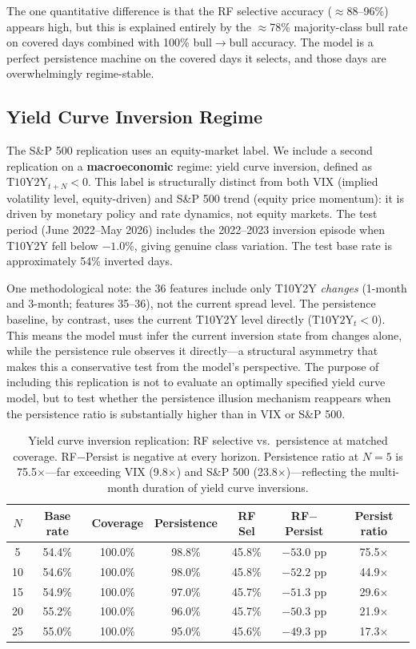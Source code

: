 \documentclass[11pt]{article}
\begin{document}
The one quantitative difference is that the RF selective accuracy ($\approx$88--96\%) appears high, but this is explained entirely by the $\approx$78\% majority-class bull rate on covered days combined with 100\% bull$\to$bull accuracy. The model is a perfect persistence machine on the covered days it selects, and those days are overwhelmingly regime-stable.

\subsection{Yield Curve Inversion Regime}
\label{sec:yc_replication}

The S\&P 500 replication uses an equity-market label. We include a second replication on a \textbf{macroeconomic} regime: yield curve inversion, defined as $\text{T10Y2Y}_{t+N} < 0$. This label is structurally distinct from both VIX (implied volatility level, equity-driven) and S\&P 500 trend (equity price momentum): it is driven by monetary policy and rate dynamics, not equity markets. The test period (June 2022--May 2026) includes the 2022--2023 inversion episode when T10Y2Y fell below $-1.0$\%, giving genuine class variation. The test base rate is approximately 54\% inverted days.

One methodological note: the 36 features include only T10Y2Y \emph{changes} (1-month and 3-month; features 35--36), not the current spread level. The persistence baseline, by contrast, uses the current T10Y2Y level directly ($\text{T10Y2Y}_t < 0$). This means the model must infer the current inversion state from changes alone, while the persistence rule observes it directly---a structural asymmetry that makes this a conservative test from the model's perspective. The purpose of including this replication is not to evaluate an optimally specified yield curve model, but to test whether the persistence illusion mechanism reappears when the persistence ratio is substantially higher than in VIX or S\&P 500.

\begin{table}[H]
\centering
\caption{Yield curve inversion replication: RF selective vs.\ persistence at matched coverage. RF$-$Persist is negative at every horizon. Persistence ratio at $N = 5$ is 75.5$\times$---far exceeding VIX (9.8$\times$) and S\&P 500 (23.8$\times$)---reflecting the multi-month duration of yield curve inversions.}
\label{tab:yc}
\begin{tabular}{ccccccc}
\toprule
$N$ & Base rate & Coverage & Persistence & RF Sel & RF$-$Persist & Persist ratio \\
\midrule
5  & 54.4\% & 100.0\% & 98.8\% & 45.8\% & $-53.0$ pp & 75.5$\times$ \\
10 & 54.6\% & 100.0\% & 98.0\% & 45.8\% & $-52.2$ pp & 44.9$\times$ \\
15 & 54.9\% & 100.0\% & 97.0\% & 45.7\% & $-51.3$ pp & 29.6$\times$ \\
20 & 55.2\% & 100.0\% & 96.0\% & 45.7\% & $-50.3$ pp & 21.9$\times$ \\
25 & 55.0\% & 100.0\% & 95.0\% & 45.6\% & $-49.3$ pp & 17.3$\times$ \\
\bottomrule
\end{tabular}
\end{table}
\end{document}
